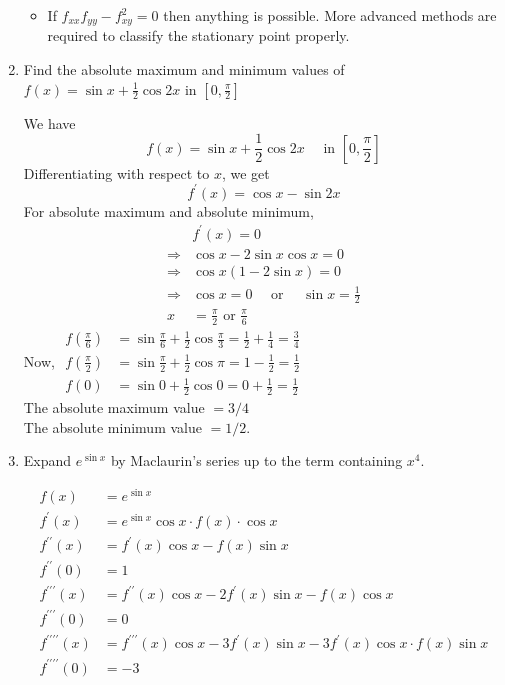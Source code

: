 \begin{enumerate}
\begin{answer}
\begin{note}
\begin{itemize}
	\item  If $f_{x x} f_{y y}-f_{x y}^{2}=0$ then anything is possible. More advanced methods are required to classify the stationary point properly.
\end{itemize}
\end{note}
\end{answer}
\item Find the absolute maximum and minimum values of $f(x)=\sin x+\frac{1}{2} \cos 2 x$ in $\left[0, \frac{\pi}{2}\right]$
\begin{answer}
	We have
	$$
	f(x)=\sin x+\frac{1}{2} \cos 2 x \quad \text { in }\left[0, \frac{\pi}{2}\right]
	$$
	Differentiating with respect to $x$, we get
	$$
	f^{\prime}(x)=\cos x-\sin 2 x
	$$
	For absolute maximum and absolute minimum,
	$$
	\begin{aligned}
	& f^{\prime}(x)=0 \\
	\Rightarrow & \cos x-2 \sin x \cos x=0 \\
	\Rightarrow & \cos x(1-2 \sin x)=0 \\
	\Rightarrow & \cos x=0 \quad \text { or } \quad \sin x=\frac{1}{2} \\
	x &=\frac{\pi}{2} \text { or } \frac{\pi}{6}
	\end{aligned}
	$$
	Now, $\begin{aligned} f\left(\frac{\pi}{6}\right) &=\sin \frac{\pi}{6}+\frac{1}{2} \cos \frac{\pi}{3}=\frac{1}{2}+\frac{1}{4}=\frac{3}{4} \\ f\left(\frac{\pi}{2}\right) &=\sin \frac{\pi}{2}+\frac{1}{2} \cos \pi=1-\frac{1}{2}=\frac{1}{2} \\ f(0) &=\sin 0+\frac{1}{2} \cos 0=0+\frac{1}{2}=\frac{1}{2} \end{aligned}$
	\\The absolute maximum value $=3 / 4$
	\\The absolute minimum value $=1 / 2$.
\end{answer}
\item Expand $e^{\sin x}$ by Maclaurin's series up to the term containing $x^{4}$.
\begin{answer}
	 
	\begin{align*}
	f(x)&= e^{\sin x} \\
	f^{\prime}(x)&= e^{\sin x} \cos x \cdot f(x) \cdot \cos x \\
	f^{\prime \prime}(x)&= f^{\prime}(x) \cos x-f(x) \sin x \\ f^{\prime \prime}(0)&=1 \\
	f^{\prime \prime \prime}(x)&= f^{\prime \prime}(x) \cos x-2 f^{\prime}(x) \sin x 
	-f(x) \cos x\\ f^{\prime \prime \prime}(0)&=0 \\
	f^{\prime \prime \prime \prime}(x)&= f^{\prime \prime \prime}(x) \cos x-3 f^{\prime}(x) \sin x 
	-3 f^{\prime}(x) \cos x \cdot f(x) \sin x  \\
	f^{\prime \prime \prime \prime}(0)&=-3
	\end{align*}
	

\end{answer}
\end{enumerate}

